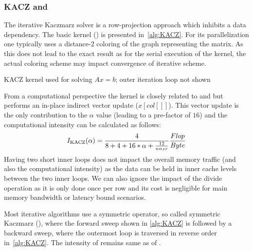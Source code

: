 \subsubsection{KACZ and \SYMMKACZ}
The iterative Kaczmarz solver is a row-projection approach which inhibits a data dependency. The basic kernel (\KACZ) is  presented in~\cref{alg:KACZ}. For its parallelization one typically uses a distance-2 coloring of the graph representing the matrix. As this does not lead to the exact result as for the serial execution of the kernel, the actual coloring scheme may impact convergence of iterative scheme.
\begin{algorithm}[H]
	\caption{KACZ kernel used for solving $Ax=b$; outer iteration loop not shown} 
	\label{alg:KACZ}
	\begin{algorithmic}[1]
		\ENDFOR
		\ENDFOR
		\ENDFOR
	\end{algorithmic}
\end{algorithm}
From a computational perspective the kernel is closely related to \SpMV and \SymmSpmv but performs an in-place indirect vector update ($x[col[]]$). This vector update is the only contribution to the $\alpha$ value (leading to a pre-factor of $16$) and the computational intensity can be calculated as follows:
\begin{equation}
\label{eq:KACZ_intensity}
I_\mathrm{KACZ} (\alpha)=  \frac{4}{8+4+16*\alpha+\frac{12}{nnzr}} \frac{Flop}{Byte}\\
\end{equation}
Having two short inner loops does not impact the overall memory traffic (and also the computational intensity) as the data can be held in inner cache levels between the two inner loops. We can also ignore the impact of the divide operation as it is only done once per row and its cost is negligible for main memory bandwidth or latency bound scenarios.  

Most iterative algorithms use a symmetric operator, so called symmetric Kaczmarz (\SYMMKACZ), where the forward sweep shown in \cref{alg:KACZ} is followed by a backward sweep, where the outermost loop is traversed in reverse order   in~\cref{alg:KACZ}. The intensity of \SYMMKACZ remains same as of \KACZ. 

